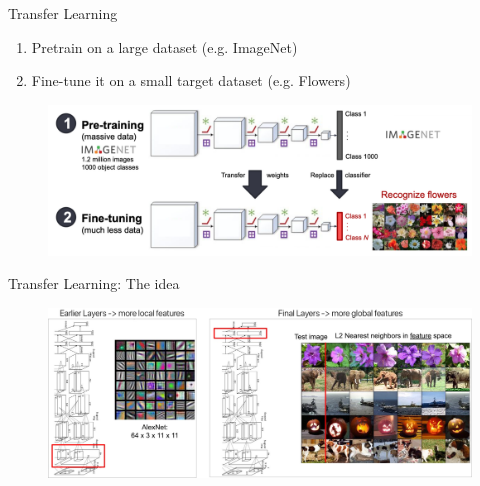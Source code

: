 \documentclass[serif, aspectratio=169]{beamer}
\begin{document}
\begin{frame}{Transfer Learning}
	\begin{enumerate}
		\item Pretrain on a large dataset (e.g. ImageNet)
		\item Fine-tune it on a small target dataset (e.g. Flowers)
	\end{enumerate}

	\begin{figure}
		\includegraphics[keepaspectratio, scale=0.23]{pic/TL_idea}
	\end{figure}
\end{frame}

\begin{frame}{Transfer Learning: The idea}
	\vspace{-1em}
	\begin{figure}[htpb]
		\begin{center}
			\includegraphics[keepaspectratio, scale=0.23]{pic/TL_alexnet}
		\end{center}
	\end{figure}
\end{frame}
\end{document}
